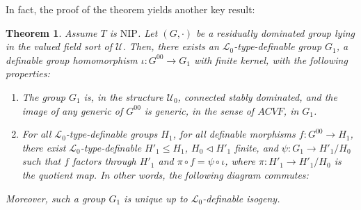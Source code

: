 \documentclass[12pt]{article}
\newcommand{\NIP}{\mathrm{NIP}}
\newcommand{\0}{\emptyset}
\newcommand{\U}{\mathcal{U}}
\newcommand{\Ualg}{\mathcal{U}_0}
\theoremstyle{plain}%
\newtheorem{thm}{Theorem}[section]
\theoremstyle{definition}
\theoremstyle{remark}
\begin{document}
In fact, the proof of the theorem yields another key result:


\begin{thm}\label{thm_acvf_enveloppe} Assume $T$ is $\NIP$.
    Let $(G,\cdot)$ be a residually dominated group lying in the valued field sort of $\U$. Then, there exists an $\mathcal{L}_0$-type-definable group $G_1$, a definable group homomorphism $\iota: G^{00} \rightarrow G_1$ with finite kernel, with the following properties:

    \begin{enumerate}
        \item The group $G_1$ is, in the structure $\Ualg$, connected stably dominated, and the image of any generic of $G^{00}$ is generic, in the sense of $ACVF$, in $G_1$.
        
        \item For all $\mathcal{L}_0$-type-definable groups $H_1$, for all definable morphisms $f: G^{00} \rightarrow H_1$, there exist $\mathcal{L}_0$-type-definable $H'_1 \leq H_1$, $H_0 \lhd H'_1$ finite, and $\psi: G_1 \rightarrow H'_1/H_0$ such that $f$ factors through $H'_1$ and $\pi \circ f = \psi \circ \iota$, where $\pi : H'_1 \rightarrow H'_1 / H_0$ is the quotient map. In other words, the following diagram commutes:
    \end{enumerate}

\begin{center}
\end{center}

    Moreover, such a group $G_1$ is unique up to $\mathcal{L}_0$-definable isogeny. 
\end{thm}
\end{document}
